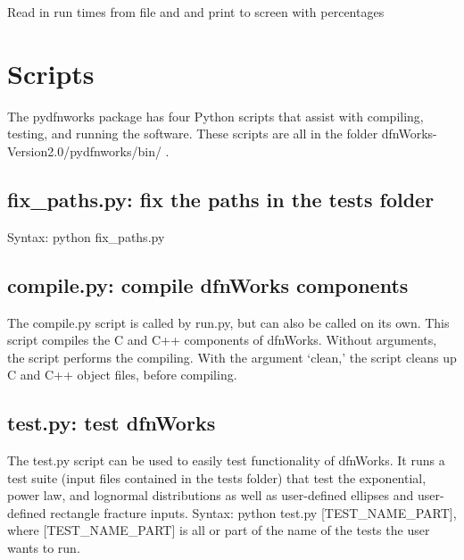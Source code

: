 \documentclass[letterpaper,10pt,english]{sphinxmanual}
\begin{document}

\begin{fulllineitems}
\label{pydfnworks:pydfnworks.helper.print_run_time}
Read in run times from file and and print to screen with percentages

\end{fulllineitems}



\chapter{Scripts}
\label{scripts:scripts}\label{scripts::doc}\label{scripts:scripts-chapter}
The pydfnworks package has four Python scripts that assist with compiling, testing, and running the software. These scripts are all in the folder dfnWorks-Version2.0/pydfnworks/bin/ .


\section{fix\_paths.py: fix the paths in the tests folder}
\label{scripts:fix-paths-py-fix-the-paths-in-the-tests-folder}
Syntax: python fix\_paths.py


\section{compile.py: compile dfnWorks components}
\label{scripts:compile-py-compile-dfnworks-components}
The compile.py script is called by run.py, but can also be called on its own. This script compiles the C and C++ components of dfnWorks. Without arguments, the script performs the compiling. With the argument `clean,' the script cleans up C and C++ object files, before compiling.


\section{test.py: test dfnWorks}
\label{scripts:test-py-test-dfnworks}
The test.py script can be used to easily test functionality of dfnWorks. It runs a test suite (input files contained in the tests folder) that test the exponential, power law, and lognormal distributions as well as user-defined ellipses and user-defined rectangle fracture inputs.
Syntax: python test.py {[}TEST\_NAME\_PART{]}, where {[}TEST\_NAME\_PART{]} is all or part of the name of the tests the user wants to run.
\end{document}

